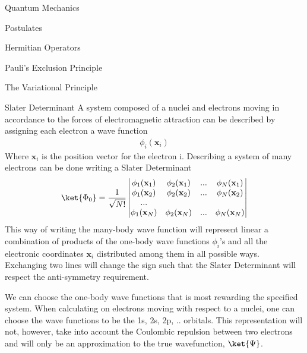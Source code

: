 \documentclass[twoside,english]{uiofysmaster}
\begin{document}
\begin{chapter}{Quantum Mechanics}
 
 \begin{section}{Postulates}
 	
 \end{section}

 \begin{section}{Hermitian Operators}
 	
 \end{section}

 \begin{section}{Pauli's Exclusion Principle}
 	
 \end{section}

 \begin{section}{The Variational Principle}
 	
 \end{section}

 \begin{section}{Slater Determinant}
 	A system composed of a nuclei and electrons moving in accordance to the forces of electromagnetic attraction can be described by assigning each electron
	a wave function 
	\begin{align}
		\phi_i(\mathbf{x}_i)
	\end{align}
	Where $\mathbf{x}_i$ is the position vector for the electron i. Describing a system of many electrons can be done writing a Slater Determinant
	\begin{align}
		\ket{\Phi_0} = \frac{1}{ \sqrt{N!} } \left|\begin{matrix}
			\phi_1(\mathbf{x}_1) & \phi_2(\mathbf{x}_1) & ... & \phi_N(\mathbf{x}_1) \\
			\phi_1(\mathbf{x}_2) & \phi_2(\mathbf{x}_2) & ... & \phi_N(\mathbf{x}_2) \\
			... & & & \\
			\phi_1(\mathbf{x}_N) & \phi_2(\mathbf{x}_N) & ... & \phi_N(\mathbf{x}_N) 
		\end{matrix} \right|
	\end{align}
	This way of writing the many-body wave function will represent linear a combination of products of the one-body wave functions $\phi_i$'s and all the electronic coordinates
	$\mathbf{x}_i$ distributed among them in all possible ways. Exchanging two lines will change the sign such that the Slater Determinant will respect the anti-symmetry 
	requirement. \par
	We can choose the one-body wave functions that is most rewarding the specified system. When calculating on electrons moving with respect to a nuclei, one can choose the wave
	functions to be the 1s, 2s, 2p, .. orbitals. This representation will not, however, take into account the Coulombic repulsion between two electrons and will only be an 
	approximation to the true wavefunction, $\ket{\Psi}$.
 \end{section}

\end{chapter}
\end{document}
